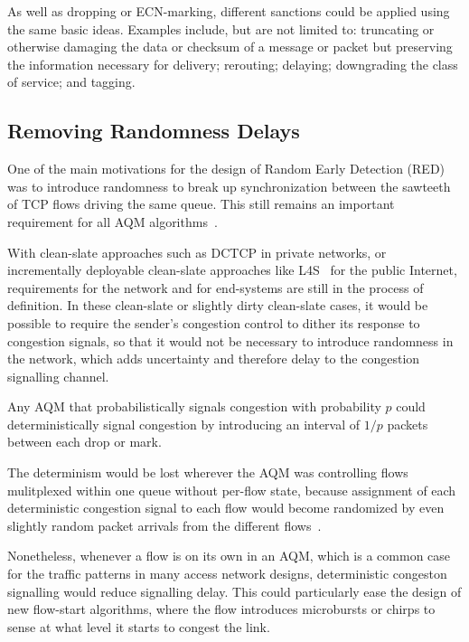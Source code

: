As well as dropping or ECN-marking, different sanctions could be applied using the same basic ideas. Examples include, but are not limited to: truncating or otherwise damaging the data or checksum of a message or packet but preserving the information necessary for delivery; rerouting; delaying; downgrading the class of service; and tagging.

\subsection{Removing Randomness Delays}\label{sec:rand_delay}

One of the main motivations for the design of Random Early Detection (RED)~\cite{Floyd93:RED} was to introduce randomness to break up synchronization between the sawteeth of TCP flows driving the same queue. This still remains an important requirement for all AQM algorithms~\cite{Baker15:AQM_Recommendations}.

With clean-slate approaches such as DCTCP in private networks, or incrementally deployable clean-slate approaches like L4S~\cite{Briscoe16a:l4s-arch_ID} for the public Internet, requirements for the network and for end-systems are still in the process of definition. In these clean-slate or slightly dirty clean-slate cases, it would be possible to require the sender's congestion control to dither its response to congestion signals, so that it would not be necessary to introduce randomness in the network, which adds uncertainty and therefore delay to the congestion signalling channel. 

Any AQM that probabilistically signals congestion with probability \(p\) could deterministically signal congestion by introducing an interval of \(1/p\) packets between each drop or mark. 

The determinism would be lost wherever the AQM was controlling flows mulitplexed within one queue without per-flow state, because assignment of each deterministic congestion signal to each flow would become randomized by even slightly random packet arrivals from the different flows~\cite{Briscoe15d:PIE_rvw}.

Nonetheless, whenever a flow is on its own in an AQM, which is a common case for the traffic patterns in many access network designs,  deterministic congeston signalling would reduce signalling delay. This could particularly ease the design of new flow-start algorithms, where the flow introduces microbursts or chirps to sense at what level it starts to congest the link.


